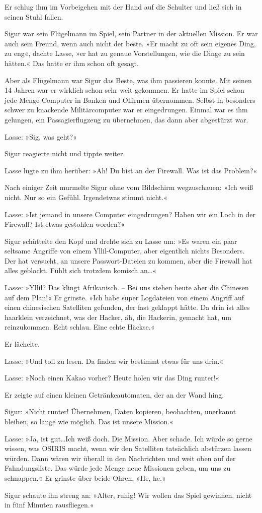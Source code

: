 Er schlug ihm im Vorbeigehen mit der Hand auf die Schulter und ließ sich in seinen Stuhl fallen.

Sigur war sein Flügelmann im Spiel, sein Partner in der aktuellen Mission.
Er war auch sein Freund, wenn auch nicht der beste.
»Er macht zu oft sein eigenes Ding, zu eng«, dachte Lasse, »er hat zu genaue Vorstellungen, wie die Dinge zu sein hätten.«
Das hatte er ihm schon oft gesagt.

Aber als Flügelmann war Sigur das Beste, was ihm passieren konnte.
Mit seinen 14 Jahren war er wirklich schon sehr weit gekommen.
Er hatte im Spiel schon jede Menge Computer in Banken und Ölfirmen übernommen.
Selbst in besonders schwer zu knackende Militärcomputer war er eingedrungen.
Einmal war es ihm gelungen, ein Passagierflugzeug zu übernehmen, das dann aber abgestürzt war.

Lasse: »Sig, was geht?«

Sigur reagierte nicht und tippte weiter.

Lasse lugte zu ihm herüber: »Ah! Du bist an der Firewall.
Was ist das Problem?«

Nach einiger Zeit murmelte Sigur ohne vom Bildschirm wegzuschauen: »Ich weiß nicht.
Nur so ein Gefühl.
Irgendetwas stimmt nicht.«

Lasse: »Ist jemand in unsere Computer eingedrungen?
Haben wir ein Loch in der Firewall?
Ist etwas gestohlen worden?«

Sigur schüttelte den Kopf und drehte sich zu Lasse um: »Es waren ein paar seltsame Angriffe von einem Yllil-Computer, aber eigentlich nichts Besonders.
Der hat versucht, an unsere Passwort-Dateien zu kommen, aber die Firewall hat alles geblockt.
Fühlt sich trotzdem komisch an\dots«

Lasse: »Yllil? Das klingt Afrikanisch.
-- Bei uns stehen heute aber die Chinesen auf dem Plan!«
Er grinste.
»Ich habe super Logdateien von einem Angriff auf einen chinesischen Satelliten gefunden, der fast geklappt hätte.
Da drin ist alles haarklein verzeichnet, was der Hacker, äh, die Hackerin, gemacht hat, um reinzukommen.
Echt schlau.
Eine echte Häckse.« 

Er lächelte.

Lasse: »Und toll zu lesen.
Da finden wir bestimmt etwas für uns drin.«

Lasse: »Noch einen Kakao vorher? Heute holen wir das Ding runter!«

Er zeigte auf einen kleinen Getränkeautomaten, der an der Wand hing.

Sigur: »Nicht runter! Übernehmen, Daten kopieren, beobachten, unerkannt bleiben, so lange wie möglich.
Das ist unsere Mission.«

Lasse: »Ja, ist gut\dots Ich weiß doch.
Die Mission.
Aber schade.
Ich würde so gerne wissen, was OSIRIS macht, wenn wir den Satelliten tatsächlich abstürzen lassen würden.
Dann wären wir überall in den Nachrichten und weit oben auf der Fahndungsliste.
Das würde jede Menge neue Missionen geben, um uns zu schnappen.« Er grinste über beide Ohren. »He, he.«

Sigur schaute ihn streng an: »Alter, ruhig! Wir wollen das Spiel gewinnen, nicht in fünf Minuten rausfliegen.«

